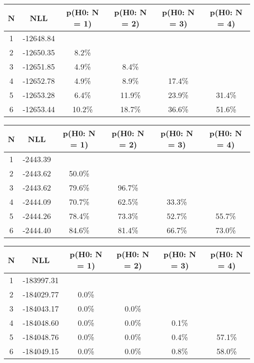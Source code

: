 \begin{table}[htb]
	\begin{center}
{\footnotesize\renewcommand{\arraystretch}{1.4}
		\begin{tabular}{cc||cccc}
			N & NLL & p(H0: N = 1) & p(H0: N = 2) & p(H0: N = 3) & p(H0: N = 4)\\ 
		\hline
1 & -12648.84 & & & & \\
2 & -12650.35 & 8.2\% & & & \\
3 & -12651.85 & 4.9\% & 8.4\% & & \\
4 & -12652.78 & 4.9\% & 8.9\% & 17.4\% & \\
5 & -12653.28 & 6.4\% & 11.9\% & 23.9\% & 31.4\% \\
6 & -12653.44 & 10.2\% & 18.7\% & 36.6\% & 51.6\% \\
	\end{tabular}
		\label{tab:lab}
	}
	\end{center}\end{table}

\begin{table}[htb]
	\begin{center}
{\footnotesize\renewcommand{\arraystretch}{1.4}
		\begin{tabular}{cc||cccc}
			N & NLL & p(H0: N = 1) & p(H0: N = 2) & p(H0: N = 3) & p(H0: N = 4)\\ 
		\hline
1 & -2443.39 & & & & \\
2 & -2443.62 & 50.0\% & & & \\
3 & -2443.62 & 79.6\% & 96.7\% & & \\
4 & -2444.09 & 70.7\% & 62.5\% & 33.3\% & \\
5 & -2444.26 & 78.4\% & 73.3\% & 52.7\% & 55.7\% \\
6 & -2444.40 & 84.6\% & 81.4\% & 66.7\% & 73.0\% \\
	\end{tabular}
		\label{tab:lab}
	}
	\end{center}\end{table}

\begin{table}[htb]
	\begin{center}
{\footnotesize\renewcommand{\arraystretch}{1.4}
		\begin{tabular}{cc||cccc}
			N & NLL & p(H0: N = 1) & p(H0: N = 2) & p(H0: N = 3) & p(H0: N = 4)\\ 
		\hline
1 & -183997.31 & & & & \\
2 & -184029.77 & 0.0\% & & & \\
3 & -184043.17 & 0.0\% & 0.0\% & & \\
4 & -184048.60 & 0.0\% & 0.0\% & 0.1\% & \\
5 & -184048.76 & 0.0\% & 0.0\% & 0.4\% & 57.1\% \\
6 & -184049.15 & 0.0\% & 0.0\% & 0.8\% & 58.0\% \\
	\end{tabular}
		\label{tab:lab}
	}
	\end{center}\end{table}

